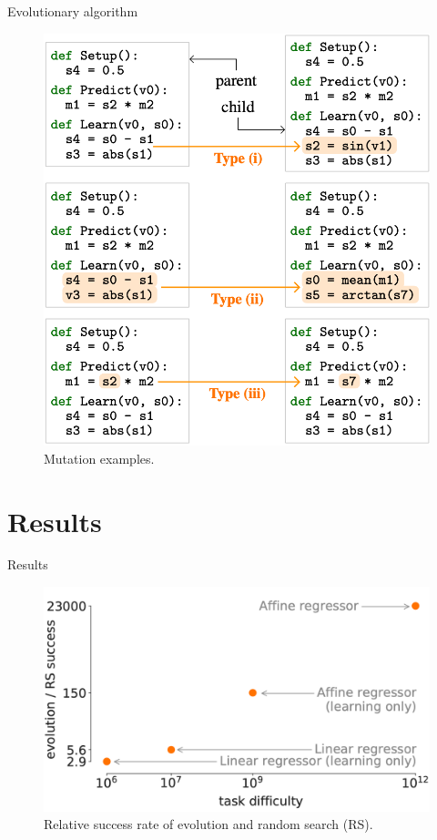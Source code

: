 \documentclass{beamer}
\begin{document}
\begin{frame}{Evolutionary algorithm}
 
    \begin{figure}
        \centering
        \includegraphics[scale=0.24]{mutation.png}
        \caption{Mutation examples.}
        \label{fig:mut}
    \end{figure}
    
\end{frame}

\section{Results}

\begin{frame}{Results}
 
    \begin{figure}
        \centering
        \includegraphics[scale=0.2]{success.png}
        \caption{Relative success rate of evolution and random search (RS).}
        \label{fig:success}
    \end{figure}
    
\end{frame}
\end{document}
